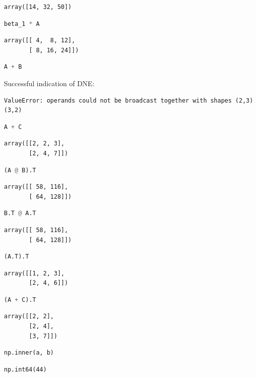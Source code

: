 \documentclass[11pt,letterpaper]{article}
\begin{document}
\begin{enumerate}
\begin{enumerate}
\begin{verbatim}
array([14, 32, 50])
\end{verbatim}
\begin{lstlisting}[language=python]
beta_1 * A
\end{lstlisting}
\begin{verbatim}
array([[ 4,  8, 12],
       [ 8, 16, 24]])
\end{verbatim}
\begin{lstlisting}[language=python]
A + B
\end{lstlisting}
Successful indication of DNE:
\begin{verbatim}
ValueError: operands could not be broadcast together with shapes (2,3) (3,2)
\end{verbatim}
\begin{lstlisting}[language=python]
A + C
\end{lstlisting}
\begin{verbatim}
array([[2, 2, 3],
       [2, 4, 7]])
\end{verbatim}
\begin{lstlisting}[language=python]
(A @ B).T
\end{lstlisting}
\begin{verbatim}
array([[ 58, 116],  
       [ 64, 128]])
\end{verbatim}
\begin{lstlisting}[language=python]
B.T @ A.T
\end{lstlisting}
\begin{verbatim}
array([[ 58, 116],
       [ 64, 128]])
\end{verbatim}
\begin{lstlisting}[language=python]
(A.T).T
\end{lstlisting}
\begin{verbatim}
array([[1, 2, 3],
       [2, 4, 6]])
\end{verbatim}
\begin{lstlisting}[language=python]
(A + C).T
\end{lstlisting}
\begin{verbatim}
array([[2, 2],
       [2, 4],
       [3, 7]])
\end{verbatim}
\begin{lstlisting}[language=python]
    np.inner(a, b)
\end{lstlisting}
\begin{verbatim}
np.int64(44)
\end{verbatim}
\begin{lstlisting}[language=python]

\end{lstlisting}
\end{enumerate}
\end{enumerate}
\end{document}
